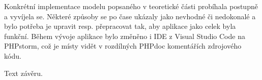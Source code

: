 

Konkrétní implementace modelu popsaného v teoretické části probíhala postupně a vyvíjela se. Některé způsoby se po čase ukázaly jako nevhodné či nedokonalé a bylo potřeba je upravit resp. přepracovat tak, aby aplikace jako celek byla funkční. Během vývoje aplikace bylo změněno i IDE z Visual Studio Code na PHPstorm, což je místy vidět v rozdílných PHPdoc komentářích zdrojového kódu.


\clearpage




 \label{section:prihlasovani}


\clearpage
{}




 \label{section:zpracovaniHlasu}




Text závěru.


